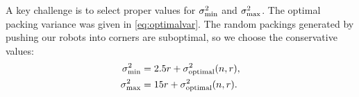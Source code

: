 

A key challenge is to select proper values for $\sigma_{\rm{min}}^2$ and $\sigma_{\rm{max}}^2$.  The optimal packing variance was given in \eqref{eq:optimalvar}.
The random packings generated by pushing our robots into corners are suboptimal, so we choose the conservative values: 
\begin{align} \label{eq:sigMaxMin}
 \sigma^2_{\rm{min}} &= 2.5r+ \sigma^2_{\rm{optimal}}(n,r), \nonumber\\
  \sigma^2_{\rm{max}} &= 15r+ \sigma^2_{\rm{optimal}}(n,r).
  \end{align}
















